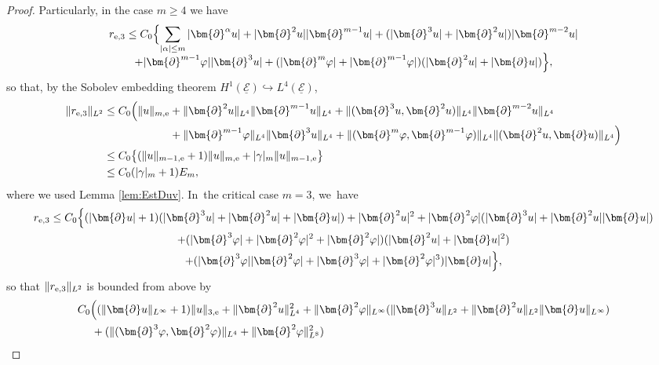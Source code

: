 \documentclass[JEP,XML,SOM,Unicode,NoFloatCountersInSection,published]{cedram}
\newcommand{\cE}{{\mathcal E}}
\newcommand{\ul}[1]{\underline{#1}}
\theoremstyle{definition}
\begin{document}
\begin{proof}
\pagebreak[2]
\noindent
Particularly, in the case $m\geq 4$ we have
\begin{multline*}
r_{{\rm e},3}
\leq C_0 \Bigl\{ \sum_{|\alpha|\leq m}|\bm{\partial}^\alpha u|
+ |\bm{\partial}^2u||\bm{\partial}^{m-1}u| + (|\bm{\partial}^3u|+|\bm{\partial}^2u|)|\bm{\partial}^{m-2}u| \\[-5pt]
+ |\bm{\partial}^{m-1}\varphi||\bm{\partial}^3u| + (|\bm{\partial}^m\varphi|+|\bm{\partial}^{m-1}\varphi|)(|\bm{\partial}^2u|+|\bm{\partial}u|) \Bigr\},
\end{multline*}
so that, by the Sobolev embedding theorem $H^1(\ul{\cE}) \hookrightarrow L^4(\ul{\cE})$,
\begin{align*}
\|r_{{\rm e},3}\|_{L^2}
&\leq C_0 \Bigl(\|u\|_{m,{\rm e}} + \|\bm{\partial}^2u\|_{L^4} \|\bm{\partial}^{m-1}u\|_{L^4}
+ \|(\bm{\partial}^3u,\bm{\partial}^2u)\|_{L^4} \|\bm{\partial}^{m-2}u\|_{L^4} \\
&\hspace*{2.12cm}
+ \|\bm{\partial}^{m-1}\varphi\|_{L^4} \|\bm{\partial}^3u\|_{L^4}
+ \|(\bm{\partial}^m\varphi,\bm{\partial}^{m-1}\varphi)\|_{L^4} \|(\bm{\partial}^2u,\bm{\partial}u)\|_{L^4} \Bigr) \\
&\leq C_0 \bigl\{ (\|u\|_{m-1,{\rm e}}+1)\|u\|_{m,{\rm e}} + |\gamma|_m \|u\|_{m-1,{\rm e}} \bigr\} \\
&\leq C_0(|\gamma|_m+1)E_m,
\end{align*}
where we used Lemma \ref{lem:EstDuv}. In~the critical case $m=3$, we~have
\begin{multline*}
r_{{\rm e},3}
\leq C_0 \Bigl\{ (|\bm{\partial}u|+1)(|\bm{\partial}^3u|+|\bm{\partial}^2u|+|\bm{\partial}u|) + |\bm{\partial}^2u|^2
+ |\bm{\partial}^2\varphi|(|\bm{\partial}^3u| + |\bm{\partial}^2u||\bm{\partial}u|) \\
+ (|\bm{\partial}^3\varphi|+|\bm{\partial}^2\varphi|^2+|\bm{\partial}^2\varphi|)(|\bm{\partial}^2u|+|\bm{\partial}u|^2) \\
+ (|\bm{\partial}^3\varphi||\bm{\partial}^2\varphi|+|\bm{\partial}^3\varphi|+|\bm{\partial}^2\varphi|^3)|\bm{\partial}u| \Bigr\},
\end{multline*}
so that $\|r_{{\rm e},3}\|_{L^2}$ is bounded from above by
\begin{align*}
& C_0 \Bigl((\|\bm{\partial}u\|_{L^\infty}+1)\|u\|_{3,{\rm e}} + \|\bm{\partial}^2u\|_{L^4}^2
+ \|\bm{\partial}^2\varphi\|_{L^\infty}(\|\bm{\partial}^3u\|_{L^2} + \|\bm{\partial}^2u\|_{L^2}\|\bm{\partial}u\|_{L^\infty}) \\
&\quad\;
+ (\|(\bm{\partial}^3\varphi,\bm{\partial}^2\varphi)\|_{L^4} + \|\bm{\partial}^2\varphi\|_{L^8}^2)

\end{align*}
\end{proof}
\end{document}
